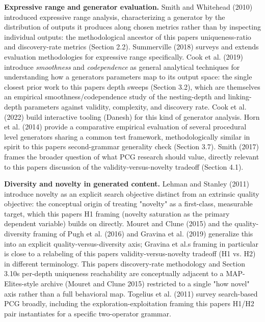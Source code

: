 \documentclass[
  10pt,
  twocolumn]{article}
\begin{document}
\textbf{Expressive range and generator evaluation.} Smith and Whitehead
(2010) introduced expressive range analysis, characterizing a generator
by the distribution of outputs it produces along chosen metrics rather
than by inspecting individual outputs: the methodological ancestor of
this paper\textquotesingle s uniqueness-ratio and discovery-rate metrics
(Section 2.2). Summerville (2018) surveys and extends evaluation
methodologies for expressive range specifically. Cook et al. (2019)
introduce \emph{smoothness} and \emph{codependence} as general
analytical techniques for understanding how a
generator\textquotesingle s parameters map to its output space: the
single closest prior work to this paper\textquotesingle s depth sweeps
(Section 3.2), which are themselves an empirical smoothness/codependence
study of the nesting-depth and linking-depth parameters against
validity, complexity, and discovery rate. Cook et al. (2022) build
interactive tooling (Danesh) for this kind of generator analysis. Horn
et al. (2014) provide a comparative empirical evaluation of several
procedural level generators sharing a common test framework,
methodologically similar in spirit to this paper\textquotesingle s
second-grammar generality check (Section 3.7). Smith (2017) frames the
broader question of what PCG research should value, directly relevant to
this paper\textquotesingle s discussion of the validity-versus-novelty
tradeoff (Section 4.1).

\textbf{Diversity and novelty in generated content.} Lehman and Stanley
(2011) introduce novelty as an explicit search objective distinct from
an extrinsic quality objective: the conceptual origin of treating
"novelty" as a first-class, measurable target, which this
paper\textquotesingle s H1 framing (novelty saturation as the primary
dependent variable) builds on directly. Mouret and Clune (2015) and the
quality-diversity framing of Pugh et al. (2016) and Gravina et al.
(2019) generalize this into an explicit quality-versus-diversity axis;
Gravina et al.\textquotesingle s framing in particular is close to a
relabeling of this paper\textquotesingle s validity-versus-novelty
tradeoff (H1 vs. H2) in different terminology. This
paper\textquotesingle s discovery-rate methodology and Section
3.10\textquotesingle s per-depth uniqueness reachability are
conceptually adjacent to a MAP-Elites-style archive (Mouret and Clune
2015) restricted to a single "how novel" axis rather than a full
behavioral map. Togelius et al. (2011) survey search-based PCG broadly,
including the exploration-exploitation framing this
paper\textquotesingle s H1/H2 pair instantiates for a specific
two-operator grammar.
\end{document}

